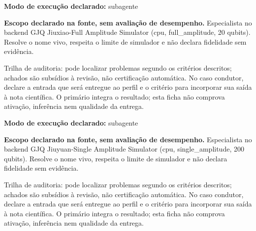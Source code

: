 \begin{arquitetura}
\textbf{Modo de execução declarado:} subagente
\end{arquitetura}


\begin{descricao}
\textbf{Escopo declarado na fonte, sem avaliação de desempenho.}
Especialista no backend GJQ Jiuxiao-Full Amplitude Simulator (cpu, full\_amplitude, 20 qubits). Resolve o nome vivo, respeita o limite de simulador e não declara fidelidade sem evidência.
\end{descricao}

\begin{funcao}
Trilha de auditoria: pode localizar problemas segundo os critérios descritos; achados são subsídios à revisão, não certificação automática. No caso condutor, declare a entrada que será entregue ao perfil e o critério para incorporar sua saída à nota científica. O primário integra o resultado; esta ficha não comprova ativação, inferência nem qualidade da entrega.
\end{funcao}

\begin{arquitetura}
\textbf{Modo de execução declarado:} subagente
\end{arquitetura}


\begin{descricao}
\textbf{Escopo declarado na fonte, sem avaliação de desempenho.}
Especialista no backend GJQ Jiuyuan-Single Amplitude Simulator (cpu, single\_amplitude, 200 qubits). Resolve o nome vivo, respeita o limite de simulador e não declara fidelidade sem evidência.
\end{descricao}

\begin{funcao}
Trilha de auditoria: pode localizar problemas segundo os critérios descritos; achados são subsídios à revisão, não certificação automática. No caso condutor, declare a entrada que será entregue ao perfil e o critério para incorporar sua saída à nota científica. O primário integra o resultado; esta ficha não comprova ativação, inferência nem qualidade da entrega.
\end{funcao}

